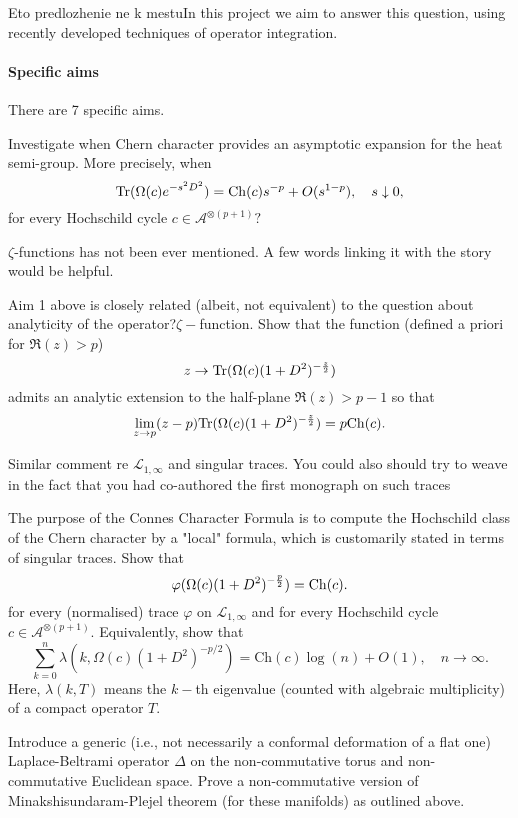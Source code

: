 \documentclass{article}
\begin{document}
{\color{red} Eto predlozhenie ne k mestu}In this project we aim to answer this question, using recently developed techniques of operator integration.
    

\paragraph*{Specific aims} There are 7 specific aims.


 Investigate when Chern character provides an asymptotic expansion for the heat semi-group. More precisely, when 
\begin{equation}\label{heat eq}
{\rm Tr}(\Omega(c)e^{-s^2D^2})={\rm Ch}(c)s^{-p}+O(s^{1-p}),\quad s\downarrow0,
\end{equation}
for every Hochschild cycle $c\in\mathcal{A}^{\otimes (p+1)}?$ 

{\color{red} $\zeta$-functions has not been ever mentioned. A few words linking it with the story would be helpful.}

 Aim 1 above is closely related (albeit, not equivalent) to the question about analyticity of the {\color{red} operator?}$\zeta-$function. Show that the function (defined a priori for $\Re(z)>p$)
$$z\to {\rm Tr}(\Omega(c)(1+D^2)^{-\frac{z}{2}})$$
admits an analytic extension to the half-plane $\Re(z)>p-1$ so that
$$\lim_{z\to p}(z-p){\rm Tr}(\Omega(c)(1+D^2)^{-\frac{z}{2}})=p{\rm Ch}(c).$$

{\color{red} Similar comment re $\mathcal{L}_{1,\infty}$ and singular traces. You could also should try to weave in the fact that you had co-authored the first monograph on such traces}

 The purpose of the Connes Character Formula is to compute the Hochschild class of the Chern character by a "local" formula, which is customarily  stated in terms of singular traces. Show that
\begin{equation}\label{super main eq}
\varphi(\Omega(c)(1+D^2)^{-\frac{p}{2}})={\rm Ch}(c).
\end{equation}
for every (normalised) trace $\varphi$ on $\mathcal{L}_{1,\infty}$ and for every Hochschild cycle $c\in\mathcal{A}^{\otimes (p+1)}.$ Equivalently, show that
$$\sum_{k=0}^n \lambda(k,\Omega(c)(1+D^2)^{-p/2}) = \mathrm{Ch}(c)\log(n)+O(1),\quad n\to\infty.$$
Here, $\lambda(k,T)$ means the $k-$th eigenvalue (counted with algebraic multiplicity) of a compact operator $T.$

 Introduce a generic (i.e., not necessarily a conformal deformation of a flat one) Laplace-Beltrami operator $\Delta$ on the non-commutative torus and non-commutative Euclidean space. Prove a non-commutative version of Minakshisundaram-Plejel theorem (for these manifolds) as outlined above.
\end{document}
